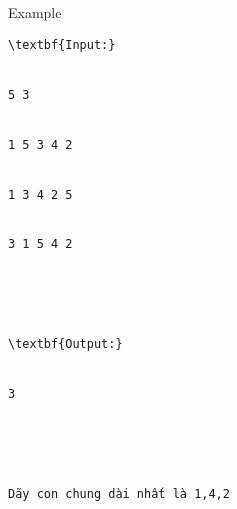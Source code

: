 Example
\begin{verbatim}
\textbf{Input:}


5 3


1 5 3 4 2


1 3 4 2 5


3 1 5 4 2





\textbf{Output:}


3





Dãy con chung dài nhất là 1,4,2


\end{verbatim}